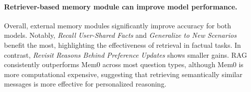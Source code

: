 


\paragraph{Retriever-based memory module can improve model performance. }
Overall, external memory modules significantly improve accuracy for both models. Notably, \textit{Recall User-Shared Facts} and \textit{Generalize to New Scenarios} benefit the most, highlighting the effectiveness of retrieval in factual tasks. In contrast, \textit{Revisit Reasons Behind Preference Updates} shows smaller gains. RAG consistently outperforms Mem0 across most question types, although Mem0 is more computational expensive, suggesting that retrieving semantically similar messages is more effective for personalized reasoning.



